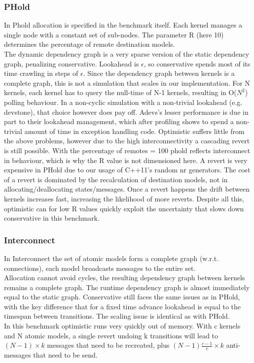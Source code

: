 \subsubsection{PHold}
In Phold allocation is specified in the benchmark itself. Each kernel manages a single node with a constant set of sub-nodes. The parameter R (here 10) determines the percentage of remote destination models.\\
The dynamic dependency graph is a very sparse version of the static dependency graph, penalizing conservative. Lookahead is $\epsilon$, so conservative spends most of its time crawling in steps of $\epsilon$. Since the dependency graph between kernels is a complete graph, this is not a simulation that scales in our implementation. For N kernels, each kernel has to query the null-time of N-1 kernels, resulting in O($N^2$) polling behaviour. In a non-cyclic simulation with a non-trivial lookahead (e.g. devstone), that choice however does pay off. Adevs's lesser performance is due in part to their lookahead management, which after profiling shows to spend a non-trivial amount of time in exception handling code. 
Optimistic suffers little from the above problems, however due to the high interconnectivity a cascading revert is still possible. With the percentage of remotes = 100 phold reflects interconnect in behaviour, which is why the R value is not dimensioned here. A revert is very expensive in PHold due to our usage of C++11's random nr generators. The cost of a revert is dominated by the recalculation of destination models, not in allocating/deallocating states/messages. Once a revert happens the drift between kernels increases fast, increasing the likelihood of more reverts. Despite all this, optimistic can for low R values quickly exploit the uncertainty that slows down conservative in this benchmark.

\subsubsection{Interconnect}
In Interconnect
the set of atomic models form a complete graph (w.r.t. connections), each model broadcasts messages to the entire set. \\
Allocation cannot avoid cycles, the resulting dependency graph between kernels remains a complete graph. The runtime dependency graph is almost immediately equal to the static graph.
Conservative still faces the same issues as in PHold, with the key difference that for a fixed time advance lookahead is equal to the timespan between transitions. The scaling issue is identical as with PHold.\\
In this benchmark optimistic runs very quickly out of memory. With c kernels and N atomic models, a single revert undoing k transitions will lead to $(N-1)\times k$ messages that need to be recreated, plus $(N-1) \frac{c-1}{c} \times k$ anti-messages that need to be send.

